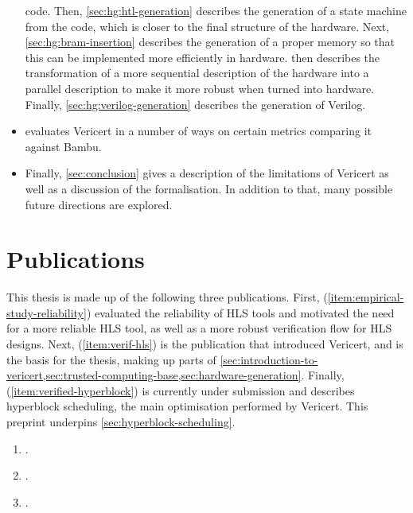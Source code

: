 \begin{itemize}
  code.  Then, \cref{sec:hg:htl-generation} describes the generation of a state
  machine from the code, which is closer to the final structure of the hardware.
  Next, \cref{sec:hg:bram-insertion} describes the generation of a proper memory
  so that this can be implemented more efficiently in hardware.
   then describes the transformation
  of a more sequential description of the hardware into a parallel description
  to make it more robust when turned into hardware.  Finally,
  \cref{sec:hg:verilog-generation} describes the generation of Verilog.
\item {} evaluates Vericert in a number of ways on certain
  metrics comparing it against Bambu.
\item Finally, \cref{sec:conclusion} gives a description of the limitations of
  Vericert as well as a discussion of the formalisation.  In addition to that,
  many possible future directions are explored.
\end{itemize}

\section{Publications}

This thesis is made up of the following three publications.  First,
(\ref{item:empirical-study-reliability}) evaluated the reliability of \gls{HLS}
tools and motivated the need for a more reliable \gls{HLS} tool, as well as a
more robust verification flow for \gls{HLS} designs.  Next,
(\ref{item:verif-hls}) is the publication that introduced Vericert, and is the
basis for the thesis, making up parts of
\cref{sec:introduction-to-vericert,sec:trusted-computing-base,sec:hardware-generation}.
Finally, (\ref{item:verified-hyperblock}) is currently under submission and
describes hyperblock scheduling, the main optimisation performed by Vericert.
This preprint underpins \cref{sec:hyperblock-scheduling}.

\begin{enumerate}
\item\label{item:empirical-study-reliability} .
\item\label{item:verif-hls} .
\item\label{item:verified-hyperblock} .
\end{enumerate}

